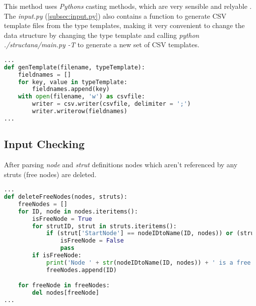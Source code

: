 This method uses \textit{Pythons} casting methods, which are very sensible and relyable \cite[2.4.1-2.4.6]{pythonTypes}. 
The \textit{input.py} (\cref{subsec:input.py}) also contains a function to generate CSV template files from the type templates, making it very convenient to change the data structure by changing the type template and calling \textit{python ./structana/main.py -T} to generate a new set of CSV templates.

\begin{inconsolata}
\begin{minipage}{\linewidth}
\begin{lstlisting}[language=python]
...
def genTemplate(filename, typeTemplate):
    fieldnames = []
    for key, value in typeTemplate:
        fieldnames.append(key)
    with open(filename, 'w') as csvfile:
        writer = csv.writer(csvfile, delimiter = ';')
        writer.writerow(fieldnames)
...
\end{lstlisting}
\end{minipage}
\end{inconsolata}

\subsection{Input Checking}
\label{sec:inputcheck}

After parsing \textit{node} and \textit{strut} definitions nodes which aren't referenced by any struts (free nodes) are deleted. 

\begin{inconsolata}
\begin{minipage}{\linewidth}
\begin{lstlisting}[language=python]
...
def deleteFreeNodes(nodes, struts):
    freeNodes = []
    for ID, node in nodes.iteritems():
        isFreeNode = True
        for strutID, strut in struts.iteritems():
            if (strut['StartNode'] == nodeIDtoName(ID, nodes)) or (strut['EndNode'] == nodeIDtoName(ID, nodes)):
                isFreeNode = False
                pass
        if isFreeNode:
            print('Node ' + str(nodeIDtoName(ID, nodes)) + ' is a free node and will be deleted.')
            freeNodes.append(ID)

    for freeNode in freeNodes:
        del nodes[freeNode]
...
\end{lstlisting}
\end{minipage}
\end{inconsolata}

